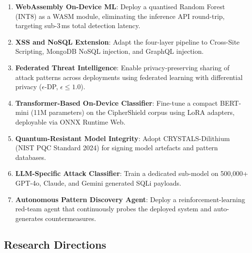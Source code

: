 \documentclass[10pt,twocolumn]{article}
\begin{document}
\begin{enumerate}[leftmargin=*,label=\arabic*.,itemsep=2pt,topsep=2pt]
  \item \textbf{WebAssembly On-Device ML}: Deploy a quantised Random
        Forest (INT8) as a WASM module, eliminating the inference
        API round-trip, targeting sub-3\,ms total detection latency.

  \item \textbf{XSS and NoSQL Extension}: Adapt the four-layer pipeline
        to Cross-Site Scripting, MongoDB NoSQL injection, and GraphQL
        injection.

  \item \textbf{Federated Threat Intelligence}: Enable
        privacy-preserving sharing of attack patterns across deployments
        using federated learning with differential privacy
        ($\epsilon$-DP, $\epsilon \leq 1.0$).

  \item \textbf{Transformer-Based On-Device Classifier}: Fine-tune
        a compact BERT-mini (11M parameters) on the CipherShield corpus
        using LoRA adapters, deployable via ONNX Runtime Web.

  \item \textbf{Quantum-Resistant Model Integrity}: Adopt
        CRYSTALS-Dilithium (NIST PQC Standard 2024) for signing model
        artefacts and pattern databases.

  \item \textbf{LLM-Specific Attack Classifier}: Train a dedicated
        sub-model on 500,000+ GPT-4o, Claude, and Gemini generated
        SQLi payloads.

  \item \textbf{Autonomous Pattern Discovery Agent}: Deploy a
        reinforcement-learning red-team agent that continuously probes
        the deployed system and auto-generates countermeasures.
\end{enumerate}

\subsection{Research Directions}
\end{document}
